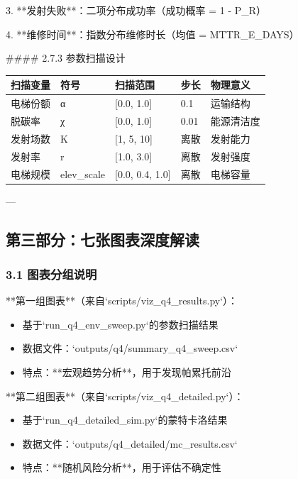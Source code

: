 \documentclass[a4paper,12pt]{article}
\begin{document}
\par
3. **发射失败**：二项分布成功率（成功概率 = 1 - P\_R）

\par
4. **维修时间**：指数分布维修时长（均值 = MTTR\_E\_DAYS）

\par
#### 2.7.3 参数扫描设计

\par
\begin{center}
\begin{longtable}{|l|l|l|l|l|}
\hline
扫描变量 & 符号 & 扫描范围 & 步长 & 物理意义 \\ \hline
电梯份额 & α & [0.0, 1.0] & 0.1 & 运输结构 \\ \hline
脱碳率 & χ & [0.0, 1.0] & 0.01 & 能源清洁度 \\ \hline
发射场数 & K & [1, 5, 10] & 离散 & 发射能力 \\ \hline
发射率 & r & [1.0, 3.0] & 离散 & 发射强度 \\ \hline
电梯规模 & elev_scale & [0.0, 0.4, 1.0] & 离散 & 电梯容量 \\ \hline
\end{longtable}
\end{center}
---

\par
\subsection{第三部分：七张图表深度解读}
\subsubsection{3.1 图表分组说明}
**第一组图表**（来自`scripts/viz\_q4\_results.py`）：

\par
\begin{itemize}
\item 基于`run_q4_env_sweep.py`的参数扫描结果
\end{itemize}
\begin{itemize}
\item 数据文件：`outputs/q4/summary_q4_sweep.csv`
\end{itemize}
\begin{itemize}
\item 特点：**宏观趋势分析**，用于发现帕累托前沿
\end{itemize}
**第二组图表**（来自`scripts/viz\_q4\_detailed.py`）：

\par
\begin{itemize}
\item 基于`run_q4_detailed_sim.py`的蒙特卡洛结果
\end{itemize}
\begin{itemize}
\item 数据文件：`outputs/q4_detailed/mc_results.csv`
\end{itemize}
\begin{itemize}
\item 特点：**随机风险分析**，用于评估不确定性
\end{itemize}
\end{document}
